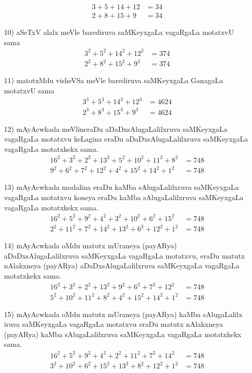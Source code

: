 \begin{enumerate}
\begin{align*}
3+5+14+12 &=34\\
2+8+15+9  &=34
\end{align*}

\item[{\rm 10)}] aSeTxV alalx meVle barediruva saMKeyxgaLa vagaRgaLa motatxvU sama
\begin{align*}
3^2+5^2+14^2+12^2 &=374\\
2^2+8^2+15^2+9^2 &=374
\end{align*}

\item[{\rm 11)}] matotxMdu visheVSa meVle barediruva saMKeyxgaLa GanagaLa motatxvU sama
\begin{align*}
3^3+5^3+14^3+12^3 &=4624\\
2^3+8^3+15^3+9^3 &=4624
\end{align*}

\item[{\rm 12)}] mAyAcwkada meVlineraDu aDaDxsAlugaLalilxruva saMKeyxgaLa vagaRgaLa motatxvu keLagina eraDu aDaDxsAlugaLalilxruva saMKeyxgaLa vagaRgaLa motatxkekx sama.
\begin{align*}
16^2+3^2+2^2+13^2+5^2+10^2+11^2+8^2 &=748\\
9^2+6^2+7^2+12^2+4^2+15^2+14^2+1^2 &=748
\end{align*}

\item[{\rm 13)}] mAyAcwkada modalina eraDu kaMba sAlugaLalilxruva saMKeyxgaLa vagaRgaLa motatxvu koneya eraDu kaMba sAlugaLalilxruva saMKeyxgaLa vagaRgaLa motatxkekx sama.
\begin{align*}
16^2+5^2+9^2+4^2+3^2+10^2+6^2+15^2 &=748\\
2^2+11^2+7^2+14^2+13^2+6^2+12^2+1^2 &=748
\end{align*}

\item[{\rm 14)}] mAyAcwkada oMdu matutx mUraneya (payARya) aDaDxsAlugaLalilxruva saMKeyxgaLa vagaRgaLa motatxvu, eraDu matutx nAlakxneya (payARya) aDaDxsAlugaLalilxruva saMKeyxgaLa vagaRgaLa motatxkekx sama.
\begin{align*}
16^2+3^2+2^2+13^2+9^2+6^2+7^2+12^2 &=748\\
5^2+10^2+11^2+8^2+4^2+15^2+14^2+1^2 &=748
\end{align*}

\item[{\rm 15)}] mAyAcwkada oMdu matutx mUraneya (payARya) kaMba sAlugaLalilx iruva saMKeyxgaLa vagaRgaLa motatxvu eraDu matutx nAlakxneya (payARya) kaMba sAlugaLalilxruva saMKeyxgaLa vagaRgaLa motatxkekx sama.
\begin{align*}
16^2+5^2+9^2+4^2+2^2+11^2+7^2+14^2 &=748\\
3^2+10^2+6^2+15^2+13^2+8^2+12^2+1^2 &=748
\end{align*}


\end{enumerate}
